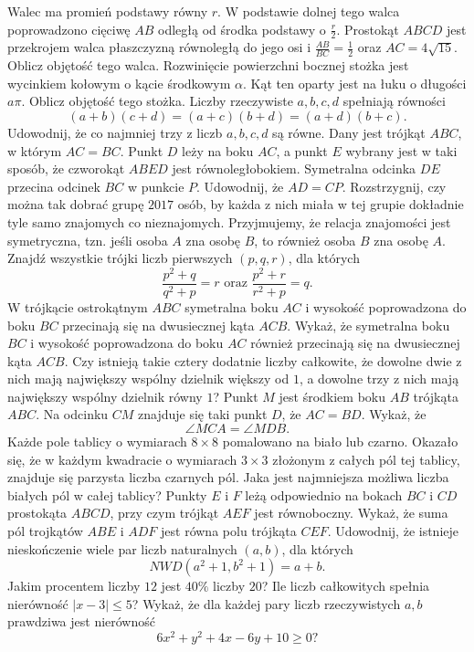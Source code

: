 Walec ma promień podstawy równy $r$. W podstawie dolnej tego walca poprowadzono cięciwę $AB$ odległą od środka podstawy o $\frac{r}{2}$. Prostokąt $ABCD$ jest przekrojem walca płaszczyzną równoległą do jego osi i $\frac{AB}{BC}=\frac{1}{2}$ oraz $AC=4\sqrt{15}$. Oblicz objętość tego walca.
Rozwinięcie powierzchni bocznej stożka jest wycinkiem kołowym o kącie środkowym $\alpha$. Kąt ten oparty jest na łuku o długości $a\pi$. Oblicz objętość tego stożka.
Liczby rzeczywiste $a,b,c,d$ spełniają równości $$(a+b)(c+d)=(a+c)(b+d)=(a+d)(b+c).$$ Udowodnij, że co najmniej trzy z liczb $a,b,c,d$ są równe.
Dany jest trójkąt $ABC$, w którym $AC=BC$. Punkt $D$ leży na boku $AC$, a punkt $E$ wybrany jest w taki sposób, że czworokąt $ABED$ jest równoległobokiem. Symetralna odcinka $DE$ przecina odcinek $BC$ w punkcie $P$. Udowodnij, że $AD=CP$.  
Rozstrzygnij, czy można tak dobrać grupę $2017$ osób, by każda z nich miała w tej grupie dokładnie tyle samo znajomych co nieznajomych. Przyjmujemy, że relacja znajomości jest symetryczna, tzn. jeśli osoba $A$ zna osobę $B$, to również osoba $B$ zna osobę $A$.
Znajdź wszystkie trójki liczb pierwszych $(p,q,r)$, dla których $$\frac{p^2+q}{q^2+p}=r\textrm{ oraz }\frac{p^2+r}{r^2+p}=q.$$
W trójkącie ostrokątnym $ABC$ symetralna boku $AC$ i wysokość poprowadzona do boku $BC$ przecinają się na dwusiecznej kąta $ACB$. Wykaż, że symetralna boku $BC$ i wysokość poprowadzona do boku $AC$ również przecinają się na dwusiecznej kąta $ACB$.
Czy istnieją takie cztery dodatnie liczby całkowite, że dowolne dwie z nich mają największy wspólny dzielnik większy od $1$, a dowolne trzy z nich mają największy wspólny dzielnik równy $1$?
Punkt $M$ jest środkiem boku $AB$ trójkąta $ABC$. Na odcinku $CM$ znajduje się taki punkt $D$, że $AC=BD$. Wykaż, że $$\angle MCA=\angle MDB.$$ 
Każde pole tablicy o wymiarach $8\times 8$ pomalowano na biało lub czarno. Okazało się, że w każdym kwadracie o wymiarach $3\times 3$ złożonym z całych pól tej tablicy, znajduje się parzysta liczba czarnych pól. Jaka jest najmniejsza możliwa liczba białych pól w całej tablicy?
Punkty $E$ i $F$ leżą odpowiednio na bokach $BC$ i $CD$ prostokąta $ABCD$, przy czym trójkąt $AEF$ jest równoboczny. Wykaż, że suma pól trojkątów $ABE$ i $ADF$ jest równa polu trójkąta $CEF$.
Udowodnij, że istnieje nieskończenie wiele par liczb naturalnych $(a,b)$, dla których $$NWD(a^2+1, b^2+1)=a+b.$$
Jakim procentem liczby $12$ jest $40\%$ liczby $20$?
Ile liczb całkowitych spełnia nierówność $|x-3|\leq 5$?
Wykaż, że dla każdej pary liczb rzeczywistych $a,b$ prawdziwa jest nierówność $$6x^2+y^2 +4x-6y+10\geq 0?$$
